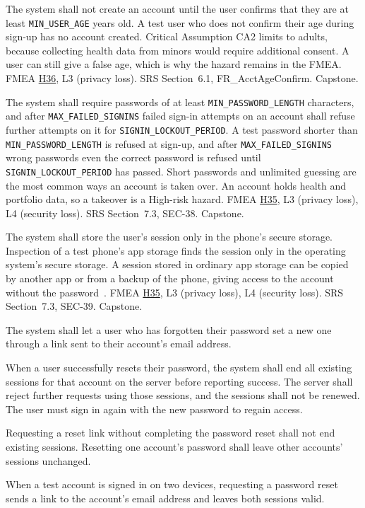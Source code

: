 \documentclass{article}
\newcommand{\hazref}[1]{\hyperref[#1]{#1}}
\begin{document}
\begin{description}
{The system shall not create an account until the user confirms that they are
at least \texttt{MIN\_USER\_AGE} years old.}
{A test user who does not confirm their age during sign-up has no account
created.}
{Critical Assumption CA2 limits \progname{} to adults, because collecting health
data from minors would require additional consent. A user can still give a
false age, which is why the hazard remains in the FMEA.}
{FMEA \hazref{H36}, L3 (privacy loss).}
{SRS Section~6.1, FR\_AcctAgeConfirm.}
{Capstone.}

{The system shall require passwords of at least \texttt{MIN\_PASSWORD\_LENGTH}
characters, and after \texttt{MAX\_FAILED\_SIGNINS} failed sign-in attempts on
an account shall refuse further attempts on it for
\texttt{SIGNIN\_LOCKOUT\_PERIOD}.}
{A test password shorter than \texttt{MIN\_PASSWORD\_LENGTH} is refused at
sign-up, and after \texttt{MAX\_FAILED\_SIGNINS} wrong passwords even the
correct password is refused until \texttt{SIGNIN\_LOCKOUT\_PERIOD} has
passed.}
{Short passwords and unlimited guessing are the most common ways an account is
taken over. An account holds health and portfolio data, so a takeover is a
High-risk hazard.}
{FMEA \hazref{H35}, L3 (privacy loss), L4 (security loss).}
{SRS Section~7.3, SEC-38.}
{Capstone.}

{The system shall store the user's session only in the phone's secure
storage.}
{Inspection of a test phone's app storage finds the session only in the
operating system's secure storage.}
{A session stored in ordinary app storage can be copied by another app or from
a backup of the phone, giving access to the account without the
password~\cite{OWASPMASVS}.}
{FMEA \hazref{H35}, L3 (privacy loss), L4 (security loss).}
{SRS Section~7.3, SEC-39.}
{Capstone.}

{The system shall let a user who has forgotten their password set a new one
through a link sent to their account's email address.

When a user successfully resets their password, the system shall end all existing sessions for that account on the server before reporting success. The server shall reject further requests using those sessions, and the sessions shall not be renewed. The user must sign in again with the new password to regain access.

Requesting a reset link without completing the password reset shall not
end existing sessions. Resetting one account's password shall leave
other accounts' sessions unchanged.}
{When a test account is signed in on two devices, requesting a password reset sends a link to the account's email address and leaves both sessions valid.

}
\end{description}
\end{document}
